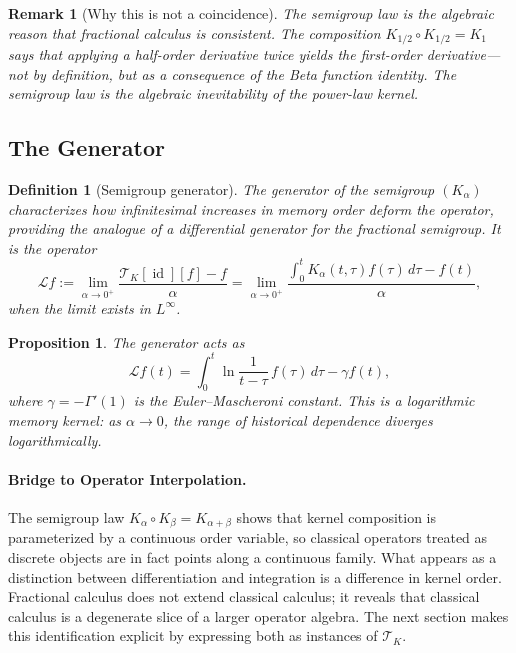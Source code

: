 \documentclass[12pt]{article}
\newtheorem{proposition}[theorem]{Proposition}
\newtheorem{definition}[theorem]{Definition}
\newtheorem{remark}[theorem]{Remark}
\DeclareMathOperator{\id}{id}
\newcommand{\TK}{\mathcal{T}_K}
\begin{document}
\begin{remark}[Why this is not a coincidence]
The semigroup law is the algebraic reason that fractional calculus is
consistent. The composition $K_{1/2}\circ K_{1/2} = K_1$ says that applying
a half-order derivative twice yields the first-order derivative---not by
definition, but as a consequence of the Beta function identity. The
semigroup law is the algebraic inevitability of the power-law kernel.
\end{remark}

\subsection{The Generator}

\begin{definition}[Semigroup generator]
The \emph{generator} of the semigroup $(K_\alpha)$ characterizes how
infinitesimal increases in memory order deform the operator, providing the
analogue of a differential generator for the fractional semigroup. It is
the operator
\[
  \mathcal{L}f := \lim_{\alpha\to 0^+} \frac{\TK[\id][f] - f}{\alpha}
  = \lim_{\alpha\to 0^+} \frac{\int_0^t K_\alpha(t,\tau)f(\tau)\,d\tau - f(t)}{\alpha},
\]
when the limit exists in $L^\infty$.
\end{definition}

\begin{proposition}
The generator acts as
\[
  \mathcal{L}f(t) = \int_0^t \ln\frac{1}{t-\tau}\, f(\tau)\, d\tau - \gamma f(t),
\]
where $\gamma = -\Gamma'(1)$ is the Euler--Mascheroni constant. This is a
logarithmic memory kernel: as $\alpha \to 0$, the range of historical
dependence diverges logarithmically.
\end{proposition}

\paragraph{Bridge to Operator Interpolation.}
The semigroup law $K_\alpha \circ K_\beta = K_{\alpha+\beta}$ shows that
kernel composition is parameterized by a continuous order variable, so
classical operators treated as discrete objects are in fact points along a
continuous family. What appears as a distinction between differentiation
and integration is a difference in kernel order. Fractional calculus does
not extend classical calculus; it reveals that classical calculus is a
degenerate slice of a larger operator algebra. The next section makes this
identification explicit by expressing both as instances of $\TK$.
\end{document}
